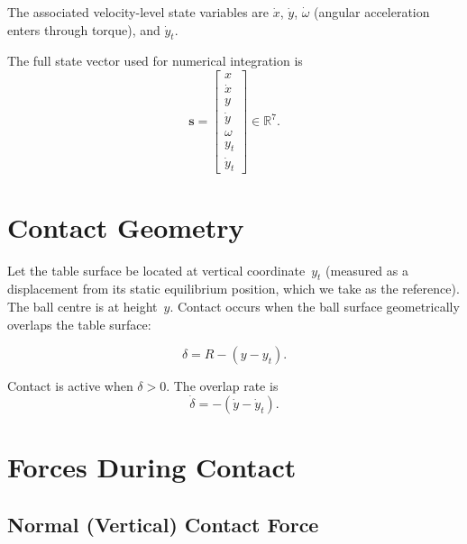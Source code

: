 \documentclass[11pt,a4paper]{article}
\begin{document}
The associated velocity-level state variables are $\dot{x}$, $\dot{y}$,
$\dot{\omega}$ (angular acceleration enters through torque), and $\dot{y}_t$.

The full state vector used for numerical integration is
\begin{equation}
  \mathbf{s} =
  \begin{bmatrix}
    x \\ \dot{x} \\ y \\ \dot{y} \\ \omega \\ y_t \\ \dot{y}_t
  \end{bmatrix}
  \in \mathbb{R}^7.
  \label{eq:state}
\end{equation}

\section{Contact Geometry}

Let the table surface be located at vertical coordinate~$y_t$ (measured as a
displacement from its static equilibrium position, which we take as the
reference). The ball centre is at height~$y$. Contact occurs when the ball
surface geometrically overlaps the table surface:

\begin{equation}
  \delta = R - (y - y_t).
  \label{eq:overlap}
\end{equation}

Contact is active when $\delta > 0$. The overlap rate is
\begin{equation}
  \dot{\delta} = -(\dot{y} - \dot{y}_t).
  \label{eq:overlap_rate}
\end{equation}

\section{Forces During Contact}

\subsection{Normal (Vertical) Contact Force}
\end{document}
